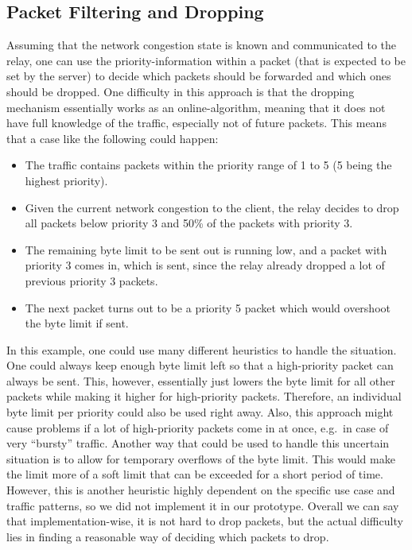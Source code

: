 \subsection{Packet Filtering and Dropping} %
Assuming that the network congestion state is known and communicated to the relay, one can 
use the priority-information within a packet (that is expected to be set by the server) to
decide which packets should be forwarded and which ones should be dropped.
One difficulty in this approach is that the dropping mechanism essentially works as an 
online-algorithm, meaning that it does not have full knowledge of the traffic, especially not of 
future packets.
This means that a case like the following could happen:
\begin{itemize}
    \item The traffic contains packets within the priority range of 1 to 5 (5 being the highest priority).
    \item Given the current network congestion to the client, the relay decides to drop 
            all packets below priority 3 and 50\% of the packets with priority 3.
    \item The remaining byte limit to be sent out is running low, and a packet with priority 3 
            comes in, which is sent, since the relay already dropped a lot of previous priority 3 packets.
    \item The next packet turns out to be a priority 5 packet which would overshoot the byte limit if sent.
\end{itemize}
In this example, one could use many different heuristics to handle the situation.
One could always keep enough byte limit left so that a high-priority packet can always be sent.
This, however, essentially just lowers the byte limit for all other packets while making it higher 
for high-priority packets.
Therefore, an individual byte limit per priority could also be used right away.
Also, this approach might cause problems if a lot of high-priority packets come in at once, 
e.g.~in case of very ``bursty'' traffic.
Another way that could be used to handle this uncertain situation is to allow for temporary 
overflows of the byte limit.
This would make the limit more of a soft limit that can be exceeded for a short period of time.
However, this is another heuristic highly dependent on the specific use case and
traffic patterns, so we did not implement it in our prototype.
Overall we can say that implementation-wise, it is not hard to drop packets, but the actual
difficulty lies in finding a reasonable way of deciding which packets to drop.